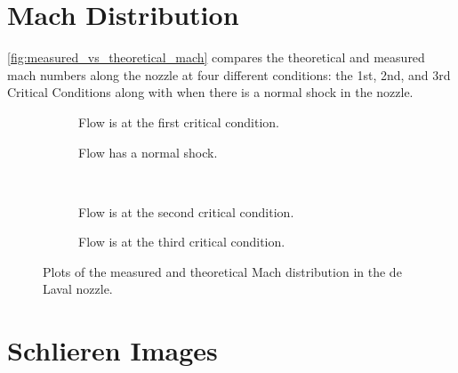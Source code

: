 \newpage

\section{Mach Distribution}

\autoref{fig:measured_vs_theoretical_mach} compares the theoretical and measured mach numbers along the nozzle at four different conditions: the 1st, 2nd, and 3rd Critical Conditions along with when there is a normal shock in the nozzle. 

\begin{figure}[htpb]
    \centering
    \begin{subfigure}{0.49\textwidth}
        \centering
        
        \caption{Flow is at the first critical condition.}
        \label{fig:measured_vs_theoretical_mach_1st_critical}
    \end{subfigure}
    \begin{subfigure}{0.49\textwidth}
        \centering
        
        \caption{Flow has a normal shock.}
        \label{fig:measured_vs_theoretical_mach_normal_shock}
    \end{subfigure} \\
    \begin{subfigure}{0.49\textwidth}
        \centering
        
        \caption{Flow is at the second critical condition.}
        \label{fig:measured_vs_theoretical_mach_2nd_critical}
    \end{subfigure}
    \begin{subfigure}{0.49\textwidth}
        \centering
        
        \caption{Flow is at the third critical condition.}
        \label{fig:measured_vs_theoretical_mach_3rd_critical}
    \end{subfigure}
    \caption{Plots of the measured and theoretical Mach distribution in the de Laval nozzle.}
    \label{fig:measured_vs_theoretical_mach}
\end{figure}

\newpage

\section{Schlieren Images}

